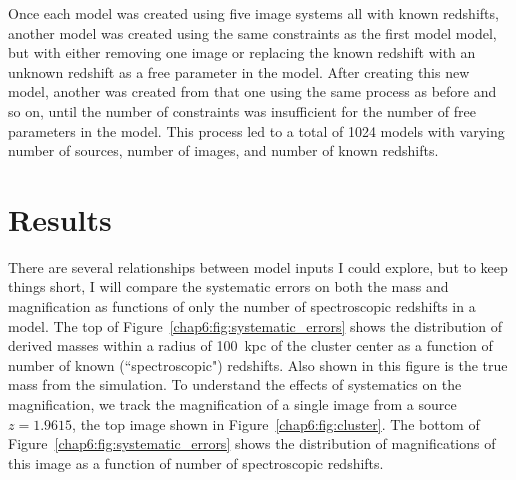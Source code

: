 Once each model was created using five image systems all with known redshifts, another model was created using the same constraints as the first model model, but with either removing one image or replacing the known redshift with an unknown redshift as a free parameter in the model. After creating this new model, another was created from that one using the same process as before and so on, until the number of constraints was insufficient for the number of free parameters in the model. This process led to a total of 1024 models with varying number of sources, number of images, and number of known redshifts.

\section{Results}

There are several relationships between model inputs I could explore, but to keep things short, I will compare the systematic errors on both the mass and magnification as functions of only the number of spectroscopic redshifts in a model. The top of Figure~\ref{chap6:fig:systematic_errors} shows the distribution of derived masses within a radius of 100~kpc of the cluster center as a function of number of known (``spectroscopic") redshifts. Also shown in this figure is the true mass from the simulation. To understand the effects of systematics on the magnification, we track the magnification of a single image from a source $z=1.9615$, the top image shown in Figure~\ref{chap6:fig:cluster}. The bottom of Figure~\ref{chap6:fig:systematic_errors} shows the distribution of magnifications of this image as a function of number of spectroscopic redshifts.

